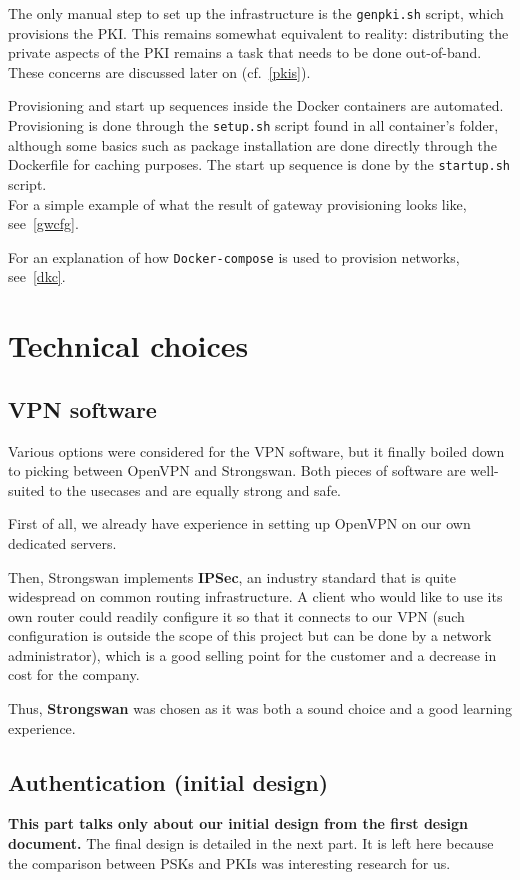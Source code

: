 \documentclass[paper=a4, fontsize=11pt]{scrartcl}
\begin{document}
The only manual step to set up the infrastructure is the \texttt{genpki.sh}
script, which provisions the PKI\@.
This remains somewhat equivalent to reality: distributing the private aspects of
the PKI remains a task that needs to be done out-of-band.
These concerns are discussed later on (cf.~\autoref{pkis}).

Provisioning and start up sequences inside the Docker containers are automated.
Provisioning is done through the \texttt{setup.sh} script found in all
container's folder, although some basics such as package installation are done
directly through the Dockerfile for caching purposes.
The start up sequence is done by the \texttt{startup.sh} script.\\

For a simple example of what the result of gateway provisioning looks like,
see~\autoref{gwcfg}.

For an explanation of how \texttt{Docker-compose} is used to provision networks,
see~\autoref{dkc}.

\section{Technical choices}

\subsection{VPN software}

Various options were considered for the VPN software, but it finally boiled down
to picking between OpenVPN and Strongswan.
Both pieces of software are well-suited to the usecases and are equally
strong and safe.

First of all, we already have experience in setting up OpenVPN on our own
dedicated servers.

Then, Strongswan implements \textbf{IPSec}, an industry standard that is quite
widespread on common routing infrastructure.
A client who would like to use its own router could readily configure
it so that it connects to our VPN (such configuration is outside the scope of
this project but can be done by a network administrator), which is a good
selling point for the customer and a decrease in cost for the company.

Thus, \textbf{Strongswan} was chosen as it was both a sound choice and a good learning
experience.

\subsection{Authentication (initial design)}
\textbf{%
\huge \danger{} \normalsize
This part talks only about our initial design from the first design document.}
The final design is detailed in the next part.
It is left here because the comparison between PSKs and PKIs was interesting
research for us.
\\
\end{document}

